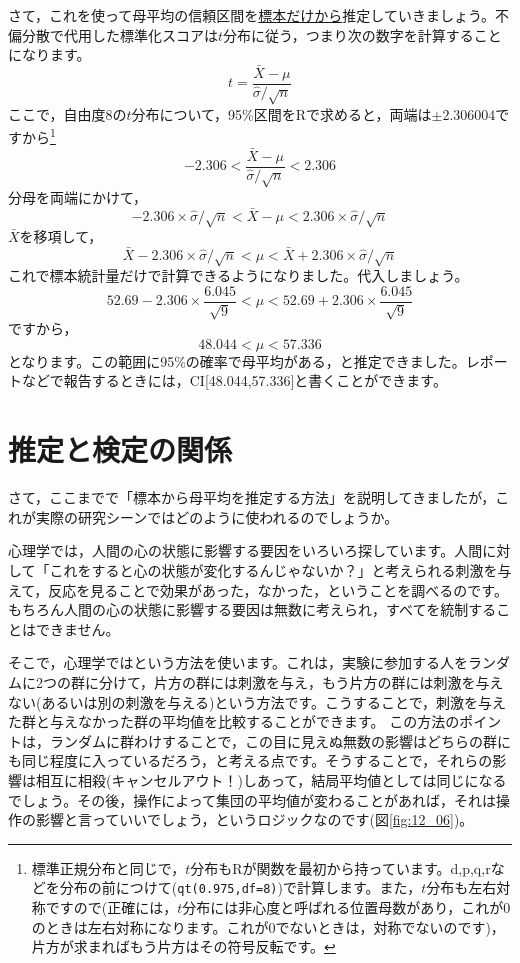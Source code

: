 \documentclass{ltjsbook}
\begin{document}
さて，これを使って母平均の信頼区間を\underline{標本だけから}推定していきましょう。不偏分散で代用した標準化スコアは$t$分布に従う，つまり次の数字を計算することになります。
\[ t = \frac{\bar{X}-\mu}{\hat{\sigma}/\sqrt{n}} \]
ここで，自由度8の$t$分布について，95\%区間をRで求めると，両端は$\pm2.306004$ですから\footnote{標準正規分布と同じで，$t$分布もRが関数を最初から持っています。d,p,q,rなどを分布の前につけて({\tt qt(0.975,df=8)})で計算します。また，$t$分布も左右対称ですので(正確には，$t$分布には非心度と呼ばれる位置母数があり，これが$0$のときは左右対称になります。これが$0$でないときは，対称でないのです)，片方が求まればもう片方はその符号反転です。}
\[ -2.306 < \frac{\bar{X}-\mu}{\hat{\sigma}/\sqrt{n}} < 2.306\]
分母を両端にかけて，
\[ -2.306 \times {\hat{\sigma}/\sqrt{n}} < \bar{X}-\mu < 2.306 \times{\hat{\sigma}/\sqrt{n}}\]
$\bar{X}$を移項して，
\[ \bar{X}-2.306 \times {\hat{\sigma}/\sqrt{n}} < \mu < \bar{X}+2.306\times{\hat{\sigma}/\sqrt{n}}\]
これで標本統計量だけで計算できるようになりました。代入しましょう。
\[ 52.69 - 2.306 \times \frac{6.045}{\sqrt{9}} < \mu < 52.69 + 2.306\times \frac{6.045}{\sqrt{9}}\]
ですから，
\[ 48.044 < \mu < 57.336 \]
となります。この範囲に95\%の確率で母平均がある，と推定できました。レポートなどで報告するときには，CI[48.044,57.336]と書くことができます。

\section{推定と検定の関係}
さて，ここまでで「標本から母平均を推定する方法」を説明してきましたが，これが実際の研究シーンではどのように使われるのでしょうか。

心理学では，人間の心の状態に影響する要因をいろいろ探しています。人間に対して「これをすると心の状態が変化するんじゃないか？」と考えられる刺激を与えて，反応を見ることで効果があった，なかった，ということを調べるのです。もちろん人間の心の状態に影響する要因は無数に考えられ，すべてを統制することはできません。

そこで，心理学ではという方法を使います。これは，実験に参加する人をランダムに2つの群に分けて，片方の群には刺激を与え，もう片方の群には刺激を与えない(あるいは別の刺激を与える)という方法です。こうすることで，刺激を与えた群と与えなかった群の平均値を比較することができます。
この方法のポイントは，ランダムに群わけすることで，この目に見えぬ無数の影響はどちらの群にも同じ程度に入っているだろう，と考える点です。そうすることで，それらの影響は相互に相殺(キャンセルアウト！)しあって，結局平均値としては同じになるでしょう。その後，操作によって集団の平均値が変わることがあれば，それは操作の影響と言っていいでしょう，というロジックなのです(図\ref{fig:12_06})。
\end{document}

